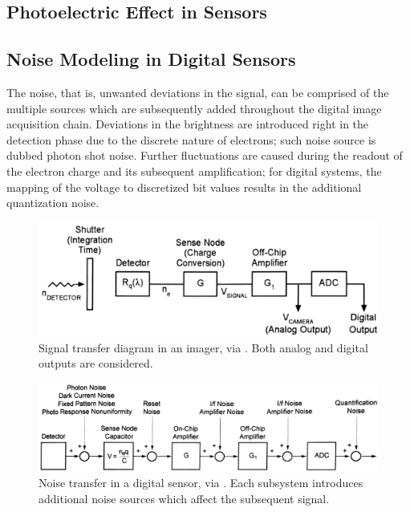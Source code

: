 \subsection{Photoelectric Effect in Sensors}



\subsection{Noise Modeling in Digital Sensors}

The noise, that is, unwanted deviations in the signal, can be comprised of the multiple sources which are subsequently added throughout the digital image acquisition chain. Deviations in the brightness are introduced right in the detection phase due to the discrete nature of electrons; such noise source is dubbed photon shot noise. Further fluctuations are caused during the readout of the electron charge and its subsequent amplification; for digital systems, the mapping of the voltage to discretized bit values results in the additional quantization noise. \cite{Holst2011}

\begin{figure}[h]
  \centering
  \includegraphics[width=\linewidth]{imgs/sensors/sens-signal-transfer.png}
  \caption{Signal transfer diagram in an imager, via \cite{Holst2011}. Both analog and digital outputs are considered.}
  \label{fig:sigtrans}
\end{figure}

\begin{figure}[h]
  \centering
  \includegraphics[width=\linewidth]{imgs/sensors/sens-noise-transfer.png}
  \caption{Noise transfer in a digital sensor, via \cite{Holst2011}. Each subsystem introduces additional noise sources which affect the subsequent signal.}
  \label{fig:noisetrans}
\end{figure}

